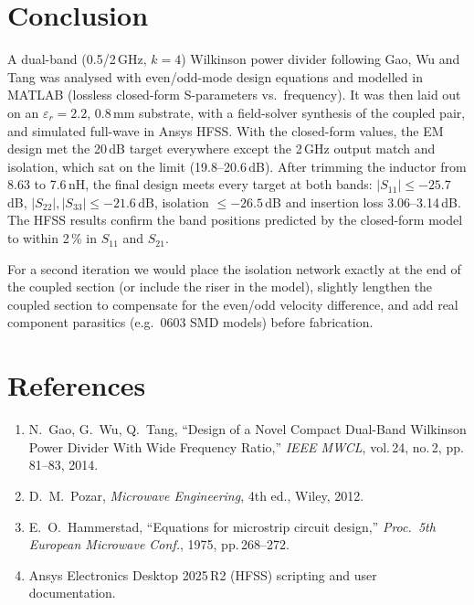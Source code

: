 \documentclass[11pt]{article}
\begin{document}
\section{Conclusion}
A dual-band (0.5/2\,GHz, $k=4$) Wilkinson power divider following Gao, Wu and Tang was
analysed with even/odd-mode design equations and modelled in MATLAB (lossless
closed-form S-parameters vs.\ frequency). It was then laid out on an
$\varepsilon_r=2.2$, 0.8\,mm substrate, with a field-solver synthesis of the coupled
pair, and simulated full-wave in Ansys HFSS. With the closed-form values, the EM design
met the 20\,dB target everywhere except the 2\,GHz output match and isolation, which
sat on the limit (19.8--20.6\,dB). After trimming the inductor from 8.63 to 7.6\,nH,
the final design meets every target at both bands: $|S_{11}|\le-25.7$\,dB,
$|S_{22}|,|S_{33}|\le-21.6$\,dB, isolation $\le-26.5$\,dB and insertion loss
3.06--3.14\,dB. The HFSS results confirm the band positions predicted by the
closed-form model to within 2\,\% in $S_{11}$ and $S_{21}$.

For a second iteration we would place the isolation network exactly at the end of the
coupled section (or include the riser in the model), slightly lengthen the coupled
section to compensate for the even/odd velocity difference, and add real component
parasitics (e.g.\ 0603 SMD models) before fabrication.

\section*{References}
\begin{enumerate}[leftmargin=1.5em]
\item N.\ Gao, G.\ Wu, Q.\ Tang, ``Design of a Novel Compact Dual-Band Wilkinson Power
Divider With Wide Frequency Ratio,'' \emph{IEEE MWCL}, vol.\,24, no.\,2, pp.\,81--83,
2014.
\item D.\ M.\ Pozar, \emph{Microwave Engineering}, 4th ed., Wiley, 2012.
\item E.\ O.\ Hammerstad, ``Equations for microstrip circuit design,'' \emph{Proc.\
5th European Microwave Conf.}, 1975, pp.\,268--272.
\item Ansys Electronics Desktop 2025\,R2 (HFSS) scripting and user documentation.
\end{enumerate}
\end{document}
